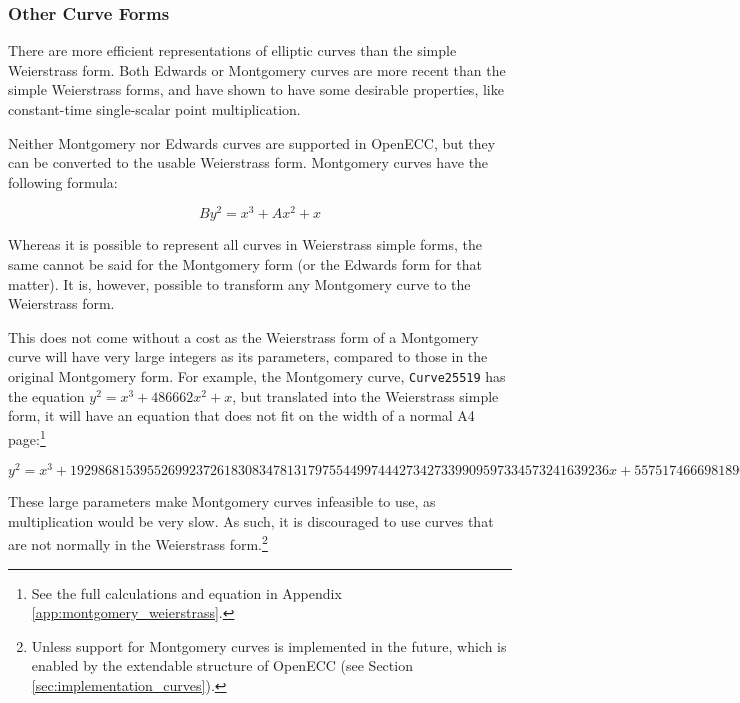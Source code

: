 \subsubsection{Other Curve Forms}
\label{sec:math_curve_curves}

There are more efficient representations of elliptic curves than the simple
Weierstrass form. Both Edwards or Montgomery curves are more recent than the simple Weierstrass forms,
and have shown to have some desirable properties, like constant-time single-scalar point multiplication.\cite{safecurves}

Neither Montgomery nor Edwards curves are supported in OpenECC, but they can be converted to the
usable Weierstrass form. Montgomery curves have the following formula:

\begin{equation}
	By^2 = x^3 + Ax^2 + x
\end{equation}

Whereas it is possible to represent all curves in Weierstrass simple forms, the same cannot be said for
the Montgomery form (or the Edwards form for that matter). It is, however, possible to
transform any Montgomery curve to the Weierstrass form.\cite{safecurves}

This does not come without a cost as the Weierstrass form of a Montgomery curve will have
very large integers as its parameters, compared to those in the original Montgomery form. For example,
the Montgomery curve, \verb|Curve25519| has the equation \(y^2 = x^3+486662x^2+x\), but
translated into the Weierstrass simple form, it will have an equation that does not fit on the width of
a normal A4 page:\footnote{See the full calculations and equation in Appendix \ref{app:montgomery_weierstrass}.}

\begin{equation}
	y^2 =
	x^3 +
	19298681539552699237261830834781317975544997444273427339909597334573241639236x +
	55751746669818908907645289078257140818241103727901012315294400837956729358436
\end{equation}

These large parameters make Montgomery curves infeasible to use, as multiplication would be very slow. As such,
it is discouraged to use curves that are not normally in the Weierstrass form.\footnote{Unless support for Montgomery
curves is implemented in the future, which is enabled by the extendable structure of OpenECC (see Section
\ref{sec:implementation_curves}).}